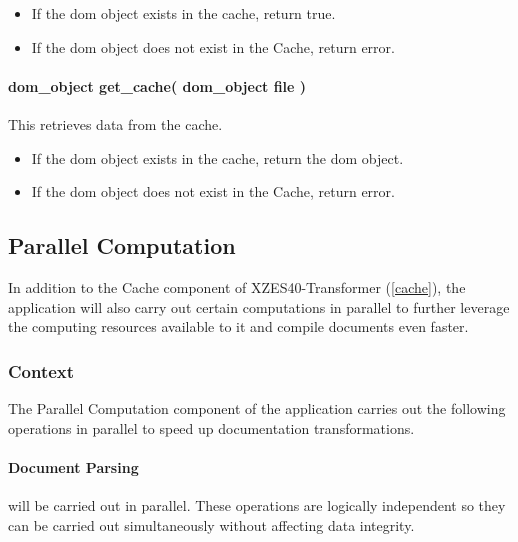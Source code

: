 \begin{itemize}
    \item If the \gls{dom} object exists in the cache, return true.
    \item If the \gls{dom} object does not exist in the Cache, return error.
\end{itemize}

\paragraph{dom\_object get\_cache( dom\_object file )} 
This retrieves data from the cache.

\begin{itemize}
    \item If the \gls{dom} object exists in the cache, return the \gls{dom} object.
    \item If the \gls{dom} object does not exist in the Cache, return error.
\end{itemize}

\subsection{Parallel Computation}
\label{parallel-computation}

In addition to the Cache component of XZES40-Transformer (\ref{cache}), the application will also carry out certain computations in parallel to further leverage the computing resources available to it and compile documents even faster.

\subsubsection{Context}

The Parallel Computation component of the application carries out the following operations in parallel to speed up documentation transformations.

\paragraph{Document Parsing} will be carried out in parallel.
These operations are logically independent so they can be carried out simultaneously without affecting data integrity.

